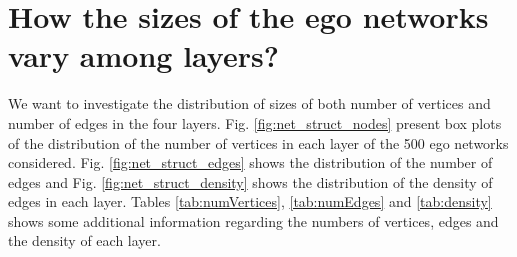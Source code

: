 

\section{How the sizes of the ego networks vary among layers?}
\label{sec:net_structure}


We want to investigate the distribution of sizes of both number of vertices and number of edges in the four layers. Fig. \ref{fig:net_struct_nodes} present box plots of the distribution of the number of vertices in each layer of the 500 ego networks considered. Fig. \ref{fig:net_struct_edges} shows the distribution of the number of edges and Fig. \ref{fig:net_struct_density} shows the distribution of the density of edges in each layer. Tables \ref{tab:numVertices}, \ref{tab:numEdges} and \ref{tab:density} shows some additional information regarding the numbers of vertices, edges and the density of each layer. 


